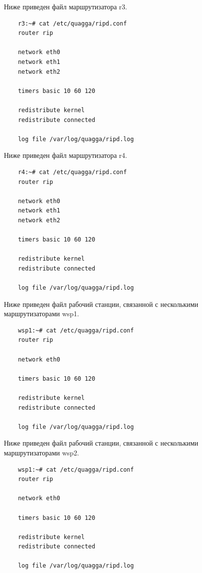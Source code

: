 \documentclass[a4paper,12pt]{article}
\begin{document}
Ниже приведен файл  маршрутизатора r3.

\begin{Verbatim}
    r3:~# cat /etc/quagga/ripd.conf
    router rip
    
    network eth0
    network eth1
    network eth2
    
    timers basic 10 60 120

    redistribute kernel
    redistribute connected
    
    log file /var/log/quagga/ripd.log
\end{Verbatim}

Ниже приведен файл  маршрутизатора r4.

\begin{Verbatim}
    r4:~# cat /etc/quagga/ripd.conf
    router rip
    
    network eth0
    network eth1
    network eth2
    
    timers basic 10 60 120

    redistribute kernel
    redistribute connected
    
    log file /var/log/quagga/ripd.log
\end{Verbatim}


Ниже приведен файл  рабочий станции, связанной с несколькими маршрутизаторами wsp1.

\begin{Verbatim}
    wsp1:~# cat /etc/quagga/ripd.conf
    router rip
    
    network eth0
    
    timers basic 10 60 120

    redistribute kernel
    redistribute connected
    
    log file /var/log/quagga/ripd.log
\end{Verbatim}

Ниже приведен файл  рабочий станции, связанной с несколькими маршрутизаторами wsp2.

\begin{Verbatim}
    wsp1:~# cat /etc/quagga/ripd.conf
    router rip
    
    network eth0
    
    timers basic 10 60 120

    redistribute kernel
    redistribute connected
    
    log file /var/log/quagga/ripd.log
\end{Verbatim}
\end{document}
